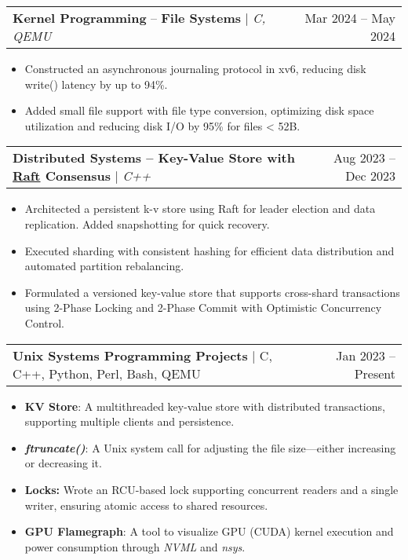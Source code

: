 \documentclass[letterpaper,11pt]{article}
\makeatletter
\newcommand{\resumeItem}[1]{
  \item\small{
    {#1 \vspace{-2pt}}
  }
}
\newcommand{\resumeProjectHeading}[2]{
    \item
    \begin{tabular*}{1.001\textwidth}{l@{\extracolsep{\fill}}r}
      \small#1 & \small #2\\
    \end{tabular*}\vspace{-7pt}
}
\newcommand{\resumeItemListStart}{\begin{itemize}}
\newcommand{\resumeItemListEnd}{\end{itemize}\vspace{-5pt}}
\makeatother
\begin{document}
\resumeProjectHeading
{\textbf{Kernel Programming} -- \textbf{File Systems} $|$ \emph{C, QEMU}}{Mar 2024 -- May 2024}
\resumeItemListStart
\resumeItem{
  Constructed an asynchronous journaling protocol in xv6, reducing disk write() latency by up to 94\%.
}
\resumeItem{
  Added small file support with file type conversion, optimizing disk space utilization and reducing disk I/O by 95\% for files \textless{} 52B.
}
\resumeItemListEnd
\vspace{-17pt}

\resumeProjectHeading
{\textbf{\normalsize{Distributed Systems -- Key-Value Store with \href{https://raft.github.io/raft.pdf}{Raft} Consensus}} $|$ \emph{C++}}{Aug 2023 -- Dec 2023}
\resumeItemListStart
\resumeItem{Architected a persistent k-v store using Raft for leader election and data replication. Added snapshotting for quick recovery.}
\resumeItem{Executed sharding with consistent hashing for efficient data distribution and automated partition rebalancing.}
\resumeItem{Formulated a versioned key-value store that supports cross-shard transactions using 2-Phase Locking and 2-Phase Commit with Optimistic Concurrency Control.}
\resumeItemListEnd
\vspace{-17pt}

\resumeProjectHeading
{\textbf{\normalsize{Unix Systems Programming Projects}} $|$ C, C++, Python, Perl, Bash, QEMU}{Jan 2023 -- Present}
\resumeItemListStart
\resumeItem{\textbf{KV Store}: A multithreaded key-value store with distributed transactions, supporting multiple clients and persistence.}
\resumeItem{
  \textbf{\textit{ftruncate()}}: A Unix system call for adjusting the file size—either increasing or decreasing it.
}
\resumeItem{\textbf{Locks:} Wrote an RCU-based lock supporting concurrent readers and a single writer, ensuring atomic access to shared resources.}
\resumeItem{\textbf{GPU Flamegraph}: A tool to visualize GPU (CUDA) kernel execution and power consumption through \textit{NVML} and \textit{nsys}.}
\resumeItemListEnd
\vspace{-17pt}
\end{document}

